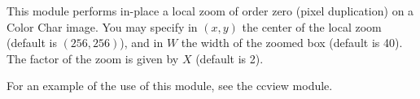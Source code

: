 This module performs in-place a local zoom of order zero
(pixel duplication) on a Color Char image.
You may specify in $(x,y)$ the center of the local zoom (default
is $(256,256)$), and in $W$ the width of the zoomed box (default is 40).
The factor of the zoom is given by $X$ (default is 2).

For an example of the use of this module, see the ccview module.

